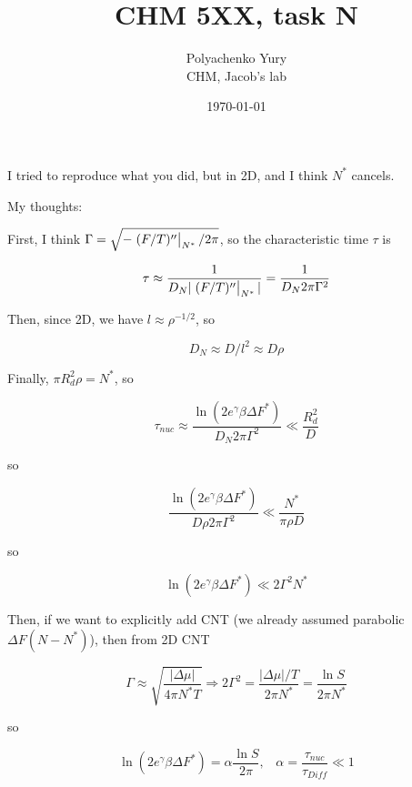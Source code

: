 \documentclass[a4paper,12pt]{article} %
\author{Polyachenko Yury \\ CHM, Jacob's lab}
\title{CHM 5XX, task N}
\date{\today}
\begin{document}

\newpage

I tried to reproduce what you did, but in 2D, and I think $N^*$ cancels.

My thoughts:

First, I think $\Gamma = \sqrt{-\eval{(F/T)''}_{N^*} / 2\pi}$, so the characteristic time $\tau$ is 

\begin{equation}
\tau \approx \frac{1}{D_N |\eval{(F/T)''}_{N^*}|} = \frac{1}{D_N 2 \pi \Gamma^2}
\end{equation}

Then, since 2D, we have $l \approx \rho^{-1/2}$, so

\begin{equation}
D_N \approx D / l^2 \approx D \rho
\end{equation}

Finally, $\pi R_d^2 \rho = N^*$, so

\begin{equation}
\tau_{nuc} \approx \frac{\ln(2 e^\gamma \beta \Delta F^*)}{D_N 2 \pi \Gamma^2} \ll \frac{R_d^2}{D}
\end{equation}

so

\begin{equation}
\frac{\ln(2 e^\gamma \beta \Delta F^*)}{D \rho 2 \pi \Gamma^2} \ll \frac{N^*}{\pi \rho D}
\end{equation}

so

\begin{equation}
\ln(2 e^\gamma \beta \Delta F^*) \ll 2 \Gamma^2 N^*
\end{equation}

Then, if we want to explicitly add CNT (we already assumed parabolic $\Delta F(N - N^*)$), then from 2D CNT

\begin{equation}
\Gamma \approx \sqrt{\frac{|\Delta \mu|}{4 \pi N^* T}} \Rightarrow 2 \Gamma^2 = \frac{|\Delta \mu|/T}{2 \pi N^*} = \frac{\ln S}{2 \pi N^*}
\end{equation}

so

\begin{equation}
\ln(2 e^\gamma \beta \Delta F^*) = \alpha \frac{\ln S}{2 \pi}, \hspace{10pt} \alpha = \frac{\tau_{nuc}}{\tau_{Diff}} \ll 1
\end{equation}
\end{document}
